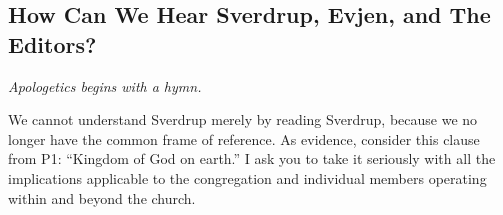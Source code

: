 




\subsection{How Can We Hear Sverdrup, Evjen, and The Editors?}





\textit{Apologetics begins with a hymn.} 

We cannot understand Sverdrup merely by reading Sverdrup, because we no longer have the common frame of reference. As evidence, consider this clause from P1: ``Kingdom of God on earth.'' I ask you to take it seriously with all the implications applicable to the congregation and individual members operating within and beyond the church.

